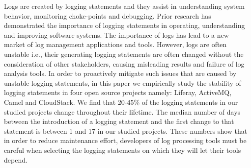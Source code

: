 
Logs are created by logging statements and they	 assist in understanding system behavior, monitoring choke-points and debugging. Prior research has demonstrated the importance of  logging statements in operating, understanding and improving software systems. The importance of logs has lead to a new market of log management applications and tools. However, logs are often unstable i.e., their generating logging statements are often changed without the consideration of other stakeholders, causing misleading results and failure of log analysis tools. In order to proactively mitigate such issues that are caused by unstable logging statements, in this paper we empirically study the stability of logging statements in four open source projects namely: Liferay, ActiveMQ, Camel and CloudStack. We find that 20-45\% of the logging statements in our studied projects change throughout their lifetime. The median number of days between the introduction of a logging statement and the first change to that statement is between 1  and 17 in our studied projects. These numbers show that in order to reduce maintenance effort, developers of log processing tools must be careful when selecting the logging statements on which they will let their tools depend.

